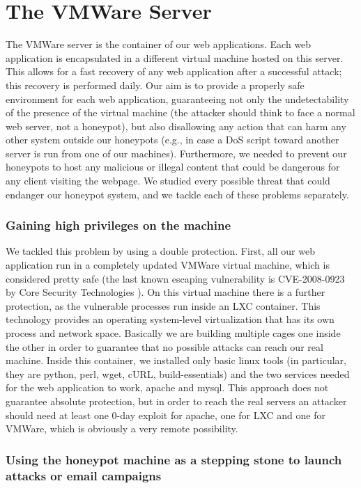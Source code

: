 \section{The VMWare Server}

The VMWare server is the container of our web applications. Each web application is encapsulated in a different virtual machine hosted on this server. This allows for a fast recovery of any web application after a successful attack; this recovery is performed daily.
Our aim is to provide a properly safe environment for each web application, guaranteeing not only the undetectability of the presence of the virtual machine (the attacker should think to face a normal web server, not a honeypot), but also disallowing any action that can harm any other system outside our honeypots (e.g., in case a DoS script toward another server is run from one of our machines). Furthermore, we needed to prevent our honeypots to host any malicious or illegal content that could be dangerous for any client visiting the webpage.
We studied every possible threat that could endanger our honeypot system, and we tackle each of these problems separately.

\subsubsection{Gaining high privileges on the machine}

 We tackled this problem by using a double protection. First, all our web application run in a completely updated VMWare virtual machine, which is considered pretty safe (the last known escaping vulnerability is CVE-2008-0923 by Core Security Technologies \cite{vmescape}). On this virtual machine there is a further protection, as the vulnerable processes run inside an LXC container. This technology provides an operating system-level virtualization that has its own process and network space. Basically we are building multiple cages one inside the other in order to guarantee that no possible attacks can reach our real machine. Inside this container, we installed only basic linux tools (in particular, they are python, perl, wget, cURL, build-essentials) and the two services needed for the web application to work, apache and mysql. This approach does not guarantee absolute protection, but in order to reach the real servers an attacker should need at least one 0-day exploit for apache, one for LXC and one for VMWare, which is obviously a very remote possibility.

\subsubsection{Using the honeypot machine as a stepping stone to launch attacks or email campaigns}

